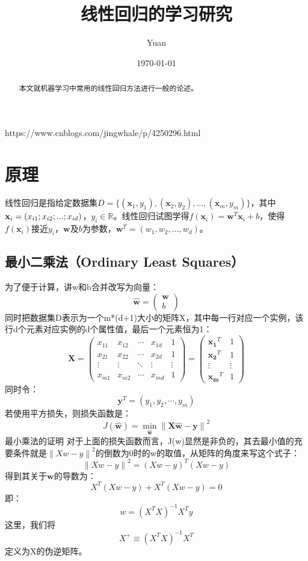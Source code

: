 \documentclass[12pt,a4paper,draft]{ctexart}
\title{线性回归的学习研究}
\author{Yuan}
\date{\today}
\begin{document}
\maketitle
\begin{abstract}
本文就机器学习中常用的线性回归方法进行一般的论述。
\end{abstract}	
https://www.cnblogs.com/jingwhale/p/4250296.html
\section{原理}
线性回归是指给定数据集$ D=\{(\mathbf{x}_{1},y_{1}),(\mathbf{x}_{2},y_{2}),...,(\mathbf{x}_{m},y_{m})\} $，其中$\mathbf{x}_i=(x_{i1};x_{i2};\\...;x_{id})$，$y_{i}\in\mathbb{R} $。线性回归试图学得$f(\mathbf{x}_{i})=\mathbf{w}^T\mathbf{x}_{i}+b$，使得$f(\mathbf{x}_{i})$接近$ y_{i}$，$\mathbf{w}$及$b$为参数，$\mathbf{w}^T=(w_1,w_2,...,w_d)$。
\subsection{最小二乘法（Ordinary Least Squares）}
为了便于计算，讲w和b合并改写为向量：
\[ \hat{\mathbf{w}}=\begin{pmatrix}
\mathbf{w} \\ 
b
\end{pmatrix}  \]
同时把数据集D表示为一个m*(d+1)大小的矩阵X，其中每一行对应一个实例，该行d个元素对应实例的d个属性值，最后一个元素恒为1：
\[ 
\mathbf{X}=
\begin{pmatrix}
	x_{11} & x_{12} & \cdots & x_{1d} & 1 \\ 
	x_{21} & x_{22} & \cdots & x_{2d} & 1 \\ 
	\vdots & \vdots & \ddots & \vdots & \vdots \\ 
	x_{m1} & x_{m2} & \cdots & x_{md} & 1
\end{pmatrix} =\begin{pmatrix}
\mathbf{x_1}^T & 1 \\ 
\mathbf{x_2}^T & 1 \\ 
\vdots & \vdots \\ 
\mathbf{x_m}^T & 1
\end{pmatrix} 
\]
同时令：
\[ \mathbf{y}^T=(y_1,y_2,\cdots,y_m) \]
若使用平方损失，则损失函数是： 
\[ J(\mathbf{\hat{w}})=\min_{\mathbf{\hat{w}}}\left \| \mathbf{X}\mathbf{\hat{w}}-\mathbf{y} \right \|^{2} \]
最小乘法的证明
对于上面的损失函数而言，J(w)显然是非负的，其去最小值的充要条件就是$ \left \| Xw-y \right \|^{2} $的倒数为0时的w的取值，从矩阵的角度来写这个式子： 
\[ \left \| Xw-y \right \|^{2}=(Xw-y)^T(Xw-y) \]
得到其关于$ \mathbf{w} $的导数为： 
\[ X^T(Xw-y) + X^T(Xw-y)=0 \]
即： 
\[ w=(X^TX)^{-1}X^Ty \]
这里，我们将\[ X^+\equiv(X^TX)^{-1}X^T \]定义为X的伪逆矩阵。
\end{document}
